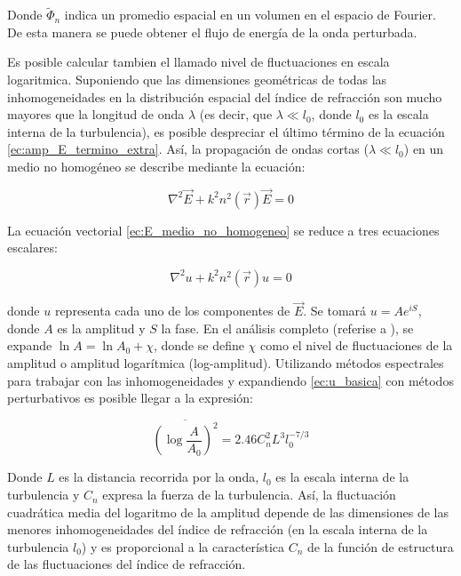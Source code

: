 Donde $ \tilde{\Phi}_n$ indica un promedio espacial en un volumen en el espacio de Fourier. De esta manera se puede obtener el flujo de energía de la onda perturbada.

Es posible calcular tambien el llamado nivel de fluctuaciones en escala logaritmica. Suponiendo que las dimensiones geométricas de todas las inhomogeneidades en la distribución espacial del índice de refracción son mucho mayores que la longitud de onda $\lambda$ (es decir, que $\lambda \ll l_0$, donde $l_0$ es la escala interna de la turbulencia), es posible despreciar el último término de la ecuación \ref{ec:amp_E_termino_extra}. Así, la propagación de ondas cortas ($\lambda \ll l_0$) en un medio no homogéneo se describe mediante la ecuación:

\begin{equation}\label{ec:E_medio_no_homogeneo}
    \nabla^2 \vec{E} + k^2 n^2(\vec{r})\vec{E} = 0
\end{equation}

La ecuación vectorial \ref{ec:E_medio_no_homogeneo} se reduce a tres ecuaciones escalares:

\begin{equation}\label{ec:u_basica}
    \nabla^2 u + k^2 n^2(\vec{r})u = 0
\end{equation}

donde $u$ representa cada uno de los componentes de $\vec{E}$. Se tomará $u = A e^{iS}$, donde $A$ es la amplitud y $S$ la fase. En el análisis completo (referise a \cite{tatarski_wave_1967}), se expande $\ln A = \ln A_0 + \chi$, donde se define $\chi$ como el nivel de fluctuaciones de la amplitud o amplitud logarítmica (log-amplitud). Utilizando métodos espectrales para trabajar con las inhomogeneidades y expandiendo \ref{ec:u_basica} con métodos perturbativos es posible llegar a la expresión:

\begin{equation}\label{ec:log_amplitud}
    \overline{\left(\log \frac{A}{A_0}\right)^2} = 2.46 C_n^2 L^3l_0^{-7/3}
\end{equation}

Donde $L$ es la distancia recorrida por la onda, $l_0$ es la escala interna de la turbulencia y $C_n$ expresa la fuerza de la turbulencia. Así, la fluctuación cuadrática media del logaritmo de la amplitud depende de las dimensiones de las menores inhomogeneidades del índice de refracción (en la escala interna de la turbulencia $l_0$) y es proporcional a la característica $C_n$ de la función de estructura de las fluctuaciones del índice de refracción.